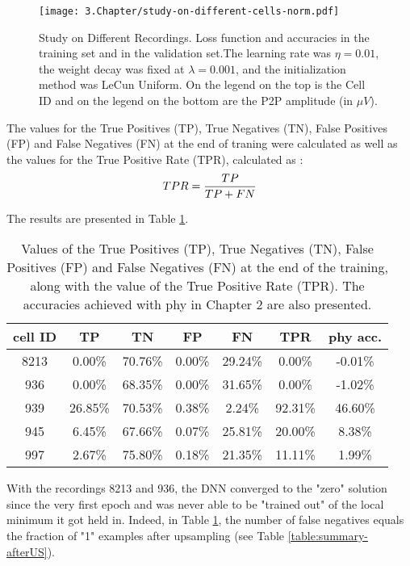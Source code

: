 \begin{figure}[htb]
	\centering
	\texttt{[image: 3.Chapter/study-on-different-cells-norm.pdf]}
	\caption{Study on Different Recordings. Loss function and accuracies in the training set and in the validation set.The learning rate was $\eta = 0.01$, the weight decay was fixed at $\lambda = 0.001$, and the initialization method was LeCun Uniform. On the legend on the top is the Cell ID and on the legend on the bottom are the P2P amplitude (in $\mu V$).
}
\label{fig:study-cells}
\end{figure}

The values for the True Positives (TP), True Negatives (TN), False Positives (FP) and False Negatives (FN) at the end of traning were calculated as well as the values for the True Positive Rate (TPR), calculated as :
\begin{equation}
\centering
TPR = \frac{TP}{TP + FN}
\end{equation}

The results are presented in Table \ref{table:confusion-matrix}.

\begin{table}[htb]
\begin{center}
\begin{tabular}{c|cccc|cc}
cell ID & TP & TN & FP & FN & TPR & phy acc.\\ \hline
8213 & 0.00\% & 70.76\% & 0.00\% & 29.24\% & 0.00\% & -0.01\% \\
936 & 0.00\% & 68.35\% & 0.00\% & 31.65\% & 0.00\% & -1.02\% \\ 
939 & 26.85\% & 70.53\% & 0.38\% & 2.24\% & 92.31\% & 46.60\% \\ 
945 & 6.45\% & 67.66\% & 0.07\% & 25.81\% & 20.00\% & 8.38\% \\ 
997 & 2.67\% & 75.80\% & 0.18\% & 21.35\% & 11.11\% & 1.99\% \\ 
\end{tabular}
\end{center}
\caption{Values of the True Positives (TP), True Negatives (TN), False Positives (FP) and False Negatives (FN) at the end of the training, along with the value of the True Positive Rate (TPR). The accuracies achieved with phy in Chapter 2 are also presented. }
\label{table:confusion-matrix}
\end{table}

With the recordings 8213 and 936, the DNN converged to the "zero" solution since the very first epoch and was never able to be "trained out" of the local minimum it got held in. Indeed, in Table \ref{table:confusion-matrix}, the number of false negatives equals the fraction of "1" examples after upsampling (see Table \ref{table:summary-afterUS}).

